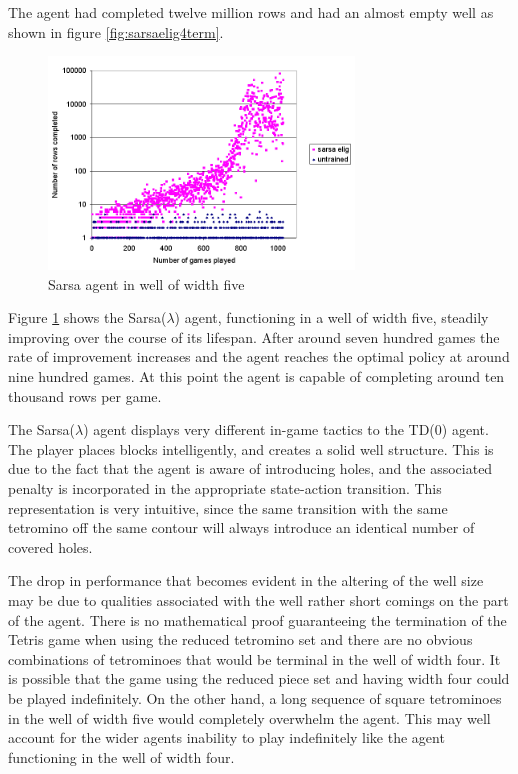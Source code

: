 \documentclass{rucsthesis}
\begin{document}
The agent had completed twelve million rows and had an almost empty well as shown in figure \ref{fig:sarsaelig4term}.

\begin{figure}[h]
\centering
\includegraphics[width=3.2in]{sarsaeligredtet5well.png}
\caption{Sarsa agent in well of width five}
\label{fig:sarsaeligredtet5well}
\end{figure}

Figure \ref{fig:sarsaeligredtet5well} shows the Sarsa($\lambda$) agent, functioning in a well of width five, steadily improving over the course of its lifespan. After around seven hundred games the rate of improvement increases and the agent reaches the optimal policy at around nine hundred games. At this point the agent is capable of completing around ten thousand rows per game.

The Sarsa($\lambda$) agent displays very different in-game tactics to the TD(0) agent. The player places blocks intelligently, and creates a solid well structure. This is due to the fact that the agent is aware of introducing holes, and the associated penalty is incorporated in the appropriate state-action transition. This representation is very intuitive, since the same transition with the same tetromino off the same contour will always introduce an identical number of covered holes.  

The drop in performance that becomes evident in the altering of the well size may be due to qualities associated with the well rather short comings on the part of the agent. There is no mathematical proof guaranteeing the termination of the Tetris game when using the reduced tetromino set and there are no obvious combinations of tetrominoes that would be terminal in the well of width four. It is possible that the game using the reduced piece set and having width four could be played indefinitely. On the other hand, a long sequence of square tetrominoes in the well of width five would completely overwhelm the agent. This may well account for the wider agents inability to play indefinitely like the agent functioning in the well of width four.
\end{document}

